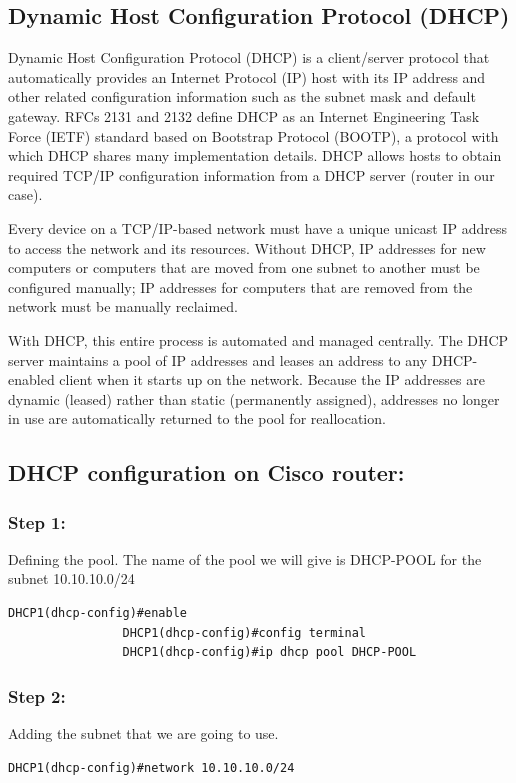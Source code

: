 \subsection{Dynamic Host Configuration Protocol (DHCP)}
Dynamic Host Configuration Protocol (DHCP) is a client/server protocol that automatically provides an Internet Protocol (IP) host with its IP address and other related configuration information such as the subnet mask and default gateway. RFCs 2131 and 2132 define DHCP as an Internet Engineering Task Force (IETF) standard based on Bootstrap Protocol (BOOTP), a protocol with which DHCP shares many implementation details. DHCP allows hosts to obtain required TCP/IP configuration information from a DHCP server (router in our case).

Every device on a TCP/IP-based network must have a unique unicast IP address to access the network and its resources. Without DHCP, IP addresses for new computers or computers that are moved from one subnet to another must be configured manually; IP addresses for computers that are removed from the network must be manually reclaimed.

With DHCP, this entire process is automated and managed centrally. The DHCP server maintains a pool of IP addresses and leases an address to any DHCP-enabled client when it starts up on the network. Because the IP addresses are dynamic (leased) rather than static (permanently assigned), addresses no longer in use are automatically returned to the pool for reallocation.

\subsection{DHCP configuration on Cisco router:}
\subsubsection{Step 1:}
Defining the pool. The name of the pool we will give is DHCP-POOL for the subnet 10.10.10.0/24
\begin{lstlisting}[style=cliStyle,  backgroundcolor=\color{codebackground}]
                DHCP1(dhcp-config)#enable
                DHCP1(dhcp-config)#config terminal
                DHCP1(dhcp-config)#ip dhcp pool DHCP-POOL
\end{lstlisting}
\subsubsection{Step 2:}
Adding the subnet that we are going to use.
\begin{lstlisting}[style=cliStyle,  backgroundcolor=\color{codebackground}]
                DHCP1(dhcp-config)#network 10.10.10.0/24
\end{lstlisting}
